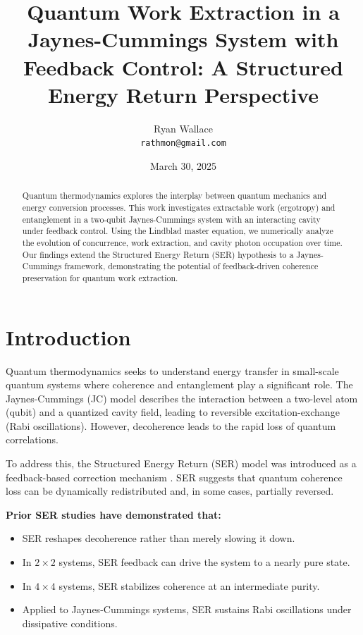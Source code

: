 \documentclass[12pt]{article}
\title{Quantum Work Extraction in a Jaynes-Cummings System with Feedback Control: A Structured Energy Return Perspective}
\author{Ryan Wallace \\ \texttt{rathmon@gmail.com}}
\date{March 30, 2025}
\begin{document}
\maketitle

\begin{abstract}
Quantum thermodynamics explores the interplay between quantum mechanics and energy conversion processes. This work investigates extractable work (ergotropy) and entanglement in a two-qubit Jaynes-Cummings system with an interacting cavity under feedback control. Using the Lindblad master equation, we numerically analyze the evolution of concurrence, work extraction, and cavity photon occupation over time. Our findings extend the Structured Energy Return (SER) hypothesis to a Jaynes-Cummings framework, demonstrating the potential of feedback-driven coherence preservation for quantum work extraction.

\end{abstract}

\section{Introduction}

Quantum thermodynamics seeks to understand energy transfer in small-scale quantum systems where coherence and entanglement play a significant role. The Jaynes-Cummings (JC) model \cite{JaynesCummings1963} describes the interaction between a two-level atom (qubit) and a quantized cavity field, leading to reversible excitation-exchange (Rabi oscillations). However, decoherence leads to the rapid loss of quantum correlations.

To address this, the Structured Energy Return (SER) model was introduced as a feedback-based correction mechanism \cite{WallaceSER2025}. SER suggests that quantum coherence loss can be dynamically redistributed and, in some cases, partially reversed. 

\textbf{Prior SER studies have demonstrated that:}
\begin{itemize}
    \item SER reshapes decoherence rather than merely slowing it down.
    \item In $2\times2$ systems, SER feedback can drive the system to a nearly pure state.
    \item In $4\times4$ systems, SER stabilizes coherence at an intermediate purity.
    \item Applied to Jaynes-Cummings systems, SER sustains Rabi oscillations under dissipative conditions.
\end{itemize}
\end{document}

